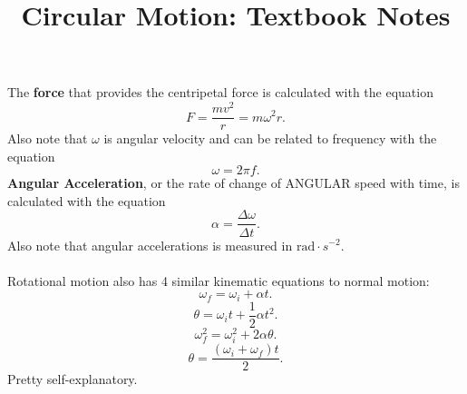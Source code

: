 \documentclass[a4paper]{report}
\title{Circular Motion: Textbook Notes}
\begin{document}
  \maketitle 
The \textbf{force} that provides the centripetal force is calculated with the equation 
  \[
  F = \frac{mv^2}{r} = m \omega ^2 r
  .\] 
  Also note that $\omega$ is angular velocity and can be related to frequency with the equation
  \[
  \omega = 2 \pi f
  .\] 
  \textbf{Angular Acceleration}, or the rate of change of ANGULAR speed with time, is calculated with the equation
  \[
  \alpha = \frac{\Delta \omega}{\Delta t}
  .\]
  Also note that angular accelerations is measured in $\text{rad} \cdot s^{-2}$.
\\ \\ 
Rotational motion also has 4 similar kinematic equations to normal motion:
\[
\omega_f = \omega_i + \alpha t
.\] 
\[
\theta = \omega_i t + \frac{1}{2}\alpha t^2
.\] 
\[
\omega_f^2 = \omega_i^2 + 2\alpha \theta
.\] 
\[
    \theta = \frac{(\omega_i + \omega_f)t}{2}
.\] 
Pretty self-explanatory. 
\end{document}
